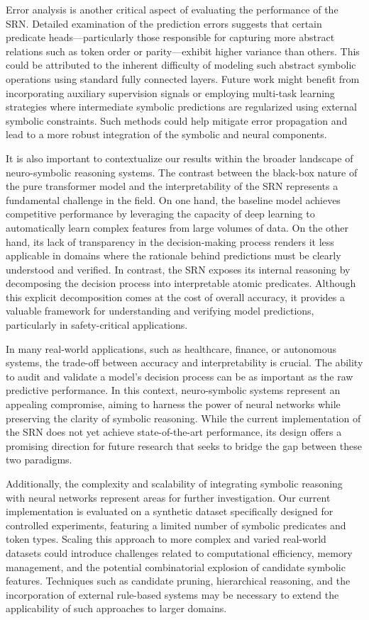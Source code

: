 \documentclass[11pt]{article}
\begin{document}
Error analysis is another critical aspect of evaluating the performance of the SRN. Detailed examination of the prediction errors suggests that certain predicate heads—particularly those responsible for capturing more abstract relations such as token order or parity—exhibit higher variance than others. This could be attributed to the inherent difficulty of modeling such abstract symbolic operations using standard fully connected layers. Future work might benefit from incorporating auxiliary supervision signals or employing multi-task learning strategies where intermediate symbolic predictions are regularized using external symbolic constraints. Such methods could help mitigate error propagation and lead to a more robust integration of the symbolic and neural components.

It is also important to contextualize our results within the broader landscape of neuro-symbolic reasoning systems. The contrast between the black-box nature of the pure transformer model and the interpretability of the SRN represents a fundamental challenge in the field. On one hand, the baseline model achieves competitive performance by leveraging the capacity of deep learning to automatically learn complex features from large volumes of data. On the other hand, its lack of transparency in the decision-making process renders it less applicable in domains where the rationale behind predictions must be clearly understood and verified. In contrast, the SRN exposes its internal reasoning by decomposing the decision process into interpretable atomic predicates. Although this explicit decomposition comes at the cost of overall accuracy, it provides a valuable framework for understanding and verifying model predictions, particularly in safety-critical applications.

In many real-world applications, such as healthcare, finance, or autonomous systems, the trade-off between accuracy and interpretability is crucial. The ability to audit and validate a model's decision process can be as important as the raw predictive performance. In this context, neuro-symbolic systems represent an appealing compromise, aiming to harness the power of neural networks while preserving the clarity of symbolic reasoning. While the current implementation of the SRN does not yet achieve state-of-the-art performance, its design offers a promising direction for future research that seeks to bridge the gap between these two paradigms.

Additionally, the complexity and scalability of integrating symbolic reasoning with neural networks represent areas for further investigation. Our current implementation is evaluated on a synthetic dataset specifically designed for controlled experiments, featuring a limited number of symbolic predicates and token types. Scaling this approach to more complex and varied real-world datasets could introduce challenges related to computational efficiency, memory management, and the potential combinatorial explosion of candidate symbolic features. Techniques such as candidate pruning, hierarchical reasoning, and the incorporation of external rule-based systems may be necessary to extend the applicability of such approaches to larger domains.
\end{document}
